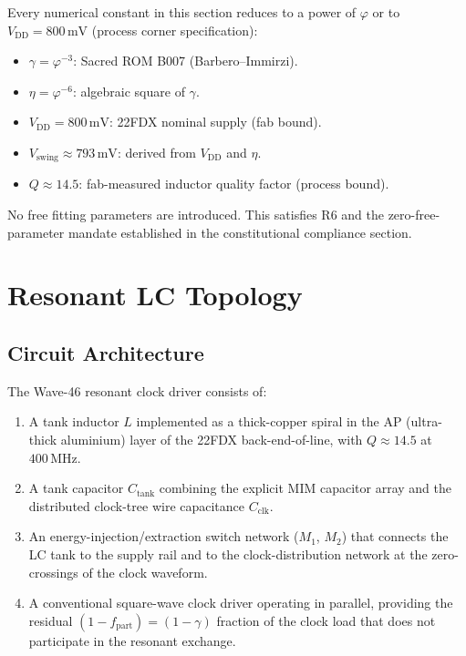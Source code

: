 Every numerical constant in this section reduces to a power of $\varphi$
or to $V_{\mathrm{DD}} = 800\,\text{mV}$ (process corner specification):
\begin{itemize}
  \item $\gamma = \varphi^{-3}$: Sacred ROM B007 (Barbero--Immirzi).
  \item $\eta = \varphi^{-6}$: algebraic square of $\gamma$.
  \item $V_{\mathrm{DD}} = 800\,\text{mV}$: 22FDX nominal supply (fab bound).
  \item $V_{\mathrm{swing}} \approx 793\,\text{mV}$: derived from $V_{\mathrm{DD}}$ and $\eta$.
  \item $Q \approx 14.5$: fab-measured inductor quality factor (process bound).
\end{itemize}
No free fitting parameters are introduced.
This satisfies R6 and the zero-free-parameter mandate established in the
constitutional compliance section.

\section{Resonant LC Topology}
\label{sec:lc-topology-w46}

\subsection{Circuit Architecture}

The Wave-46 resonant clock driver consists of:
\begin{enumerate}
  \item A tank inductor $L$ implemented as a thick-copper spiral in the AP
        (ultra-thick aluminium) layer of the 22FDX back-end-of-line, with
        $Q \approx 14.5$ at $400\,\text{MHz}$.
  \item A tank capacitor $C_{\mathrm{tank}}$ combining the explicit MIM
        capacitor array and the distributed clock-tree wire capacitance
        $C_{\mathrm{clk}}$.
  \item An energy-injection/extraction switch network ($M_1$, $M_2$) that
        connects the LC tank to the supply rail and to the clock-distribution
        network at the zero-crossings of the clock waveform.
  \item A conventional square-wave clock driver operating in parallel,
        providing the residual $(1 - f_{\mathrm{part}}) = (1-\gamma)$ fraction
        of the clock load that does not participate in the resonant exchange.
\end{enumerate}


